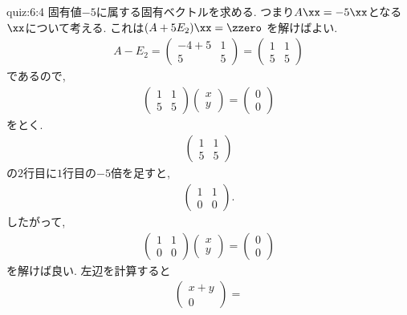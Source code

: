 \begin{answerof}{quiz:6:4}
  固有値$-5$に属する固有ベクトルを求める.
  つまり$A\xx=-5\xx$となる$\xx$について考える.
  これは$(A+5E_2)\xx=\zzero$
  を解けばよい.
  \begin{align*}
    A-E_2=\begin{pmatrix}-4+5&1\\5&5\end{pmatrix}
    =\begin{pmatrix}1&1\\5&5\end{pmatrix}
  \end{align*}
  であるので,
  \begin{align*}
    \begin{pmatrix}1&1\\5&5\end{pmatrix}
    \begin{pmatrix}x\\y\end{pmatrix}=
    \begin{pmatrix}0\\0\end{pmatrix}
  \end{align*}
  をとく.
  \begin{align*}
    \begin{pmatrix}1&1\\5&5\end{pmatrix}
  \end{align*}
  の$2$行目に$1$行目の$-5$倍を足すと,
 \begin{align*}
    \begin{pmatrix}1&1\\0&0\end{pmatrix}.
  \end{align*}
 したがって,
  \begin{align*}
    \begin{pmatrix}1&1\\0&0\end{pmatrix}
      \begin{pmatrix}x\\y\end{pmatrix}
=
    \begin{pmatrix}0\\0\end{pmatrix}
  \end{align*}
  を解けば良い.
  左辺を計算すると
  \begin{align*}
    \begin{pmatrix}x+y\\0\end{pmatrix}=

\end{align*}
\end{answerof}
